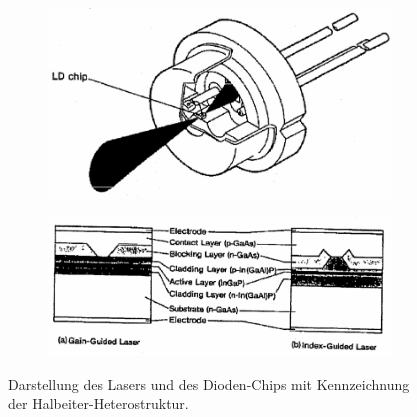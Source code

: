 \begin{figure}
  \begin{subfigure}[c]{0.5\textwidth}
    \centering
    \includegraphics[width=\textwidth]{images/Diodenl.pdf}
    \label{fig:chip}
  \end{subfigure}
  \begin{subfigure}[c]{0.5\textwidth}
    \includegraphics[width=\textwidth, angle=1, origin=c]{images/schema.pdf}
    \label{fig:struktur}
  \end{subfigure}
  \caption{Darstellung des Lasers und des Dioden-Chips mit Kennzeichnung der
  Halbeiter-Heterostruktur\cite{anleitung}.}
\end{figure}

